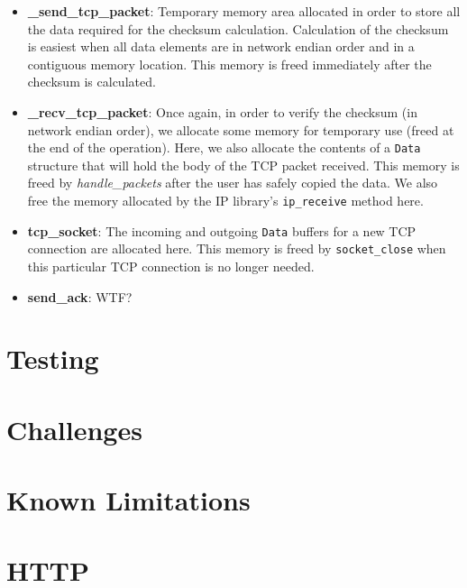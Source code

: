 \documentclass{article}
\begin{document}
\begin{itemize}
\item \textbf{\_send\_tcp\_packet}: Temporary memory area allocated in order to store all the data required for the checksum calculation. Calculation of the checksum is easiest when all data elements are in network endian order and in a contiguous memory location. This memory is freed immediately after the checksum is calculated.

\item \textbf{\_recv\_tcp\_packet}: Once again, in order to verify the checksum (in network endian order), we allocate some memory for temporary use (freed at the end of the operation). Here, we also allocate the contents of a \texttt{Data} structure that will hold the body of the TCP packet received. This memory is freed by \textit{handle\_packets} after the user has safely copied the data. We also free the memory allocated by the IP library's \texttt{ip\_receive} method here.

\item \textbf{tcp\_socket}: The incoming and outgoing \texttt{Data} buffers for a new TCP connection are allocated here. This memory is freed by \texttt{socket\_close} when this particular TCP connection is no longer needed.

\item \textbf{send\_ack}: WTF?
\end{itemize}
\section{Testing}

\section{Challenges}

\section{Known Limitations}

\section{HTTP}
\end{document}
